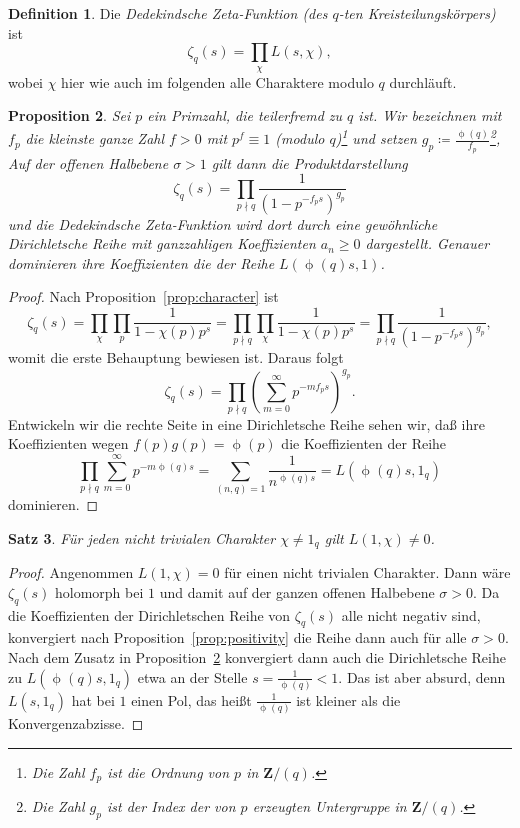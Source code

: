 \documentclass[a4paper,twoside,openright]{report}
\newtheorem{thm}{Satz}[chapter]
\newtheorem{prop}[thm]{Proposition}
\theoremstyle{definition}
\newtheorem{dfn}[thm]{Definition}
\theoremstyle{remark}
\DeclareMathOperator{\totient}{\phi}
\begin{document}
\begin{dfn}
  Die \emph{Dedekindsche Zeta-Funktion (des $q$-ten Kreisteilungskörpers)} ist
  \[
    \zeta_q(s) = \prod_{\chi} L(s, \chi),
  \]
  wobei $\chi$ hier wie auch im folgenden alle Charaktere modulo $q$ durchläuft.
\end{dfn}

\begin{prop}
  \label{prop:zeta_product}
  Sei $p$ ein Primzahl, die teilerfremd zu $q$ ist.
  Wir bezeichnen mit $f_p$ die kleinste
  ganze Zahl $f > 0$ mit $p^f \equiv 1$ (modulo $q$)\footnote{Die Zahl $f_p$ ist die
  Ordnung von $p$ in $\mathbf Z/(q)$.} und setzen
  $g_p \coloneqq \frac{\totient(q)}{f_p}$\footnote{Die Zahl $g_p$ ist der Index
  der von $p$ erzeugten Untergruppe in $\mathbf Z/(q)$.},
  Auf der offenen Halbebene $\sigma > 1$ gilt dann die Produktdarstellung
  \[
    \zeta_q(s) = \prod_{p \nmid q} \frac 1 {(1 - p^{- f_p s})^{g_p}}
  \]
  und die Dedekindsche Zeta-Funktion wird dort durch eine gewöhnliche
  Dirichletsche Reihe mit ganzzahligen Koeffizienten $a_n \ge 0$ dargestellt. 
  Genauer dominieren ihre Koeffizienten die der Reihe $L(\totient(q) s, 1)$.
\end{prop}

\begin{proof}
  Nach Proposition~\ref{prop:character} ist
  \[
    \zeta_q(s) = \prod_\chi \prod_p \frac 1 {1 - \chi(p) p^s}
    = \prod_{p \nmid q} \prod_\chi \frac 1 {1 - \chi(p) p^s}
    = \prod_{p \nmid q} \frac 1 {(1 - p^{- f_p s})^{g_p}},
  \]
  womit die erste Behauptung bewiesen ist.
  Daraus folgt
  \[
    \zeta_q(s) = \prod_{p \nmid q} \left(\sum_{m = 0}^\infty p^{-m f_p s}\right)^{g_p}.
  \]
  Entwickeln wir die rechte Seite in eine Dirichletsche Reihe sehen wir, daß ihre
  Koeffizienten wegen $f(p) g(p) = \totient(p)$ die Koeffizienten der Reihe
  \[
    \prod_{p \nmid q} \sum_{m = 0}^\infty p^{-m \totient(q) s}
    = \sum_{(n, q) = 1} \frac 1 {n^{\totient(q) s}}
    = L(\totient(q) s, 1_q)
  \]
  dominieren.
\end{proof}

\begin{thm}
  Für jeden nicht trivialen Charakter $\chi \neq 1_q$ gilt $L(1, \chi) \neq 0$.
\end{thm}

\begin{proof}
  Angenommen $L(1, \chi) = 0$ für einen nicht trivialen Charakter. Dann wäre
  $\zeta_q(s)$ holomorph bei $1$ und damit auf der ganzen offenen Halbebene
  $\sigma > 0$. Da die Koeffizienten der Dirichletschen Reihe von
  $\zeta_q(s)$ alle nicht negativ sind, konvergiert nach Proposition~\ref{prop:positivity}
  die Reihe dann auch für alle $\sigma > 0$. Nach dem Zusatz in Proposition~\ref{prop:zeta_product}
  konvergiert dann auch die Dirichletsche Reihe zu $L(\totient(q) s, 1_q)$ etwa 
  an der Stelle $s = \frac 1 {\totient(q)} < 1$. Das ist aber absurd, denn
  $L(s, 1_q)$ hat bei $1$ einen Pol, das heißt $\frac 1 {\totient(q)}$ ist kleiner
  als die Konvergenzabzisse. 
\end{proof}
\end{document}
